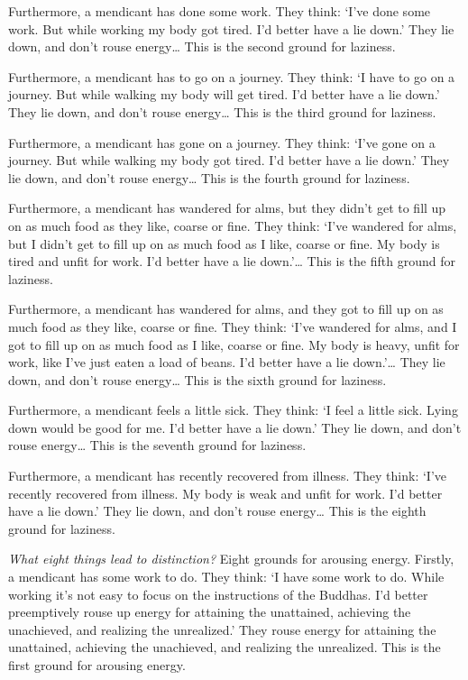 \documentclass[12pt,openany]{book}%
\begin{document}
Furthermore, a mendicant has done some work. They think: ‘I’ve done some work. But while working my body got tired. I’d better have a lie down.’ They lie down, and don’t rouse energy… This is the second ground for laziness. 

Furthermore, a mendicant has to go on a journey. They think: ‘I have to go on a journey. But while walking my body will get tired. I’d better have a lie down.’ They lie down, and don’t rouse energy… This is the third ground for laziness. 

Furthermore, a mendicant has gone on a journey. They think: ‘I’ve gone on a journey. But while walking my body got tired. I’d better have a lie down.’ They lie down, and don’t rouse energy… This is the fourth ground for laziness. 

Furthermore, a mendicant has wandered for alms, but they didn’t get to fill up on as much food as they like, coarse or fine. They think: ‘I’ve wandered for alms, but I didn’t get to fill up on as much food as I like, coarse or fine. My body is tired and unfit for work. I’d better have a lie down.’… This is the fifth ground for laziness. 

Furthermore, a mendicant has wandered for alms, and they got to fill up on as much food as they like, coarse or fine. They think: ‘I’ve wandered for alms, and I got to fill up on as much food as I like, coarse or fine. My body is heavy, unfit for work, like I’ve just eaten a load of beans. I’d better have a lie down.’… They lie down, and don’t rouse energy… This is the sixth ground for laziness. 

Furthermore, a mendicant feels a little sick. They think: ‘I feel a little sick. Lying down would be good for me. I’d better have a lie down.’ They lie down, and don’t rouse energy… This is the seventh ground for laziness. 

Furthermore, a mendicant has recently recovered from illness. They think: ‘I’ve recently recovered from illness. My body is weak and unfit for work. I’d better have a lie down.’ They lie down, and don’t rouse energy… This is the eighth ground for laziness. 

\emph{What eight things lead to distinction?} Eight grounds for arousing energy. Firstly, a mendicant has some work to do. They think: ‘I have some work to do. While working it’s not easy to focus on the instructions of the Buddhas. I’d better preemptively rouse up energy for attaining the unattained, achieving the unachieved, and realizing the unrealized.’ They rouse energy for attaining the unattained, achieving the unachieved, and realizing the unrealized. This is the first ground for arousing energy. 
\end{document}
